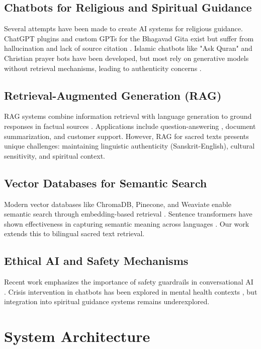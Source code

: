 \documentclass[conference]{IEEEtran}
\begin{document}
\subsection{Chatbots for Religious and Spiritual Guidance}
Several attempts have been made to create AI systems for religious guidance. ChatGPT plugins and custom GPTs for the Bhagavad Gita exist but suffer from hallucination and lack of source citation \cite{placeholder1}. Islamic chatbots like "Ask Quran" and Christian prayer bots have been developed, but most rely on generative models without retrieval mechanisms, leading to authenticity concerns \cite{placeholder2}.

\subsection{Retrieval-Augmented Generation (RAG)}
RAG systems combine information retrieval with language generation to ground responses in factual sources \cite{lewis2020retrieval}. Applications include question-answering \cite{placeholder3}, document summarization, and customer support. However, RAG for sacred texts presents unique challenges: maintaining linguistic authenticity (Sanskrit-English), cultural sensitivity, and spiritual context.

\subsection{Vector Databases for Semantic Search}
Modern vector databases like ChromaDB, Pinecone, and Weaviate enable semantic search through embedding-based retrieval \cite{placeholder4}. Sentence transformers have shown effectiveness in capturing semantic meaning across languages \cite{reimers2019sentence}. Our work extends this to bilingual sacred text retrieval.

\subsection{Ethical AI and Safety Mechanisms}
Recent work emphasizes the importance of safety guardrails in conversational AI \cite{placeholder5}. Crisis intervention in chatbots has been explored in mental health contexts \cite{placeholder6}, but integration into spiritual guidance systems remains underexplored.

\section{System Architecture}
\end{document}
